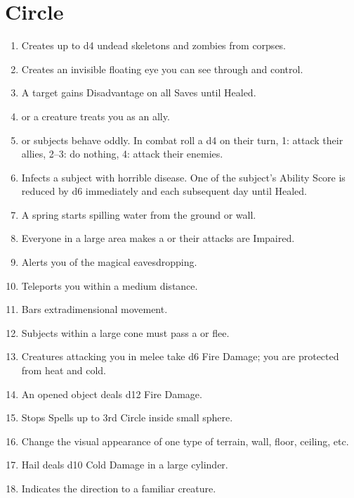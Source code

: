 \documentclass[itdr]{subfiles}
\begin{document}
\section{ Circle}
\begin{enumerate}
	\item {} Creates up to d4 undead skeletons and zombies from corpses.
	\item {} Creates an invisible floating eye you can see through and control.
	\item {} A target gains Disadvantage on all Saves until Healed.
	\item {}  or a creature treats you as an ally.
	\item {}  or subjects behave oddly. In combat roll a d4 on their turn, 1: attack their allies, 2--3: do nothing, 4: attack their enemies.
	\item {} Infects a subject with horrible disease. One of the subject's Ability Score is reduced by d6 immediately and each subsequent day until Healed.
	\item {} A spring starts spilling water from the ground or wall.
	\item {} Everyone in a large area makes a  or their attacks are Impaired.
	\item {} Alerts you of the magical eavesdropping.
	\item {} Teleports you within a medium distance.
	\item {} Bars extradimensional movement.
	\item {} Subjects within a large cone must pass a  or flee.
	\item {} Creatures attacking you in melee take d6 Fire Damage; you are protected from heat and cold.
	\item {} An opened object deals d12 Fire Damage.
	\item {} Stops Spells up to 3rd Circle inside small sphere.
	\item {} Change the visual appearance of one type of terrain, wall, floor, ceiling, etc.
	\item {} Hail deals d10 Cold Damage in a large cylinder.
	\item {} Indicates the direction to a familiar creature.

\end{enumerate}
\end{document}
